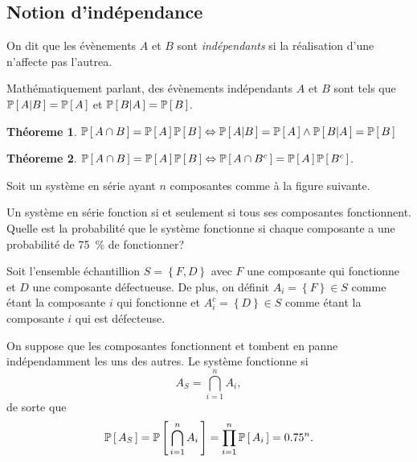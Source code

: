 \documentclass[11pt]{article}
\renewcommand\P[1]{%
	\ensuremath{%
		\mathbb{P}\left[\,#1\,\right]%
	}%
}%
\newcommand\Pg[2]{%
	\ensuremath{%
		\mathbb{P}\left[\,#1\middle\rvert#2\,\right]%
	}%
}%
\newtheorem{theoreme}{Théoreme}[section]
\begin{document}
\subsection{Notion d'indépendance}
\begin{definition}
	On dit que les évènements $A$ et $B$ sont \textit{indépendants} si la
	réalisation d'une n'affecte pas l'autrea.
\end{definition}

Mathématiquement parlant, des évènements indépendants $A$ et $B$ sont tels que
$\Pg{A}{B}=\P{A}$ et $\Pg{B}{A}=\P{B}$.

\begin{theoreme}
	$\P{A\cap B}=\P{A}\P{B}\Leftrightarrow\Pg{A}{B}=\P{A}\wedge\Pg{B}{A}=\P{B}$
\end{theoreme}

\begin{theoreme}
	$\P{A\cap B}=\P{A}\P{B}\Leftrightarrow\P{A\cap B^c}=\P{A}\P{B^c}$.
\end{theoreme}

\begin{exemple}
	Soit un système en série ayant $n$ composantes comme à la figure suivante.
	\begin{figure}[H]
		\centering
		
	\end{figure}
	Un système en série fonction si et seulement si tous ses composantes
	fonctionnent. Quelle est la probabilité que le système fonctionne si chaque
	composante a une probabilité de \SI{75}{\percent} de fonctionner?

	Soit l'ensemble échantillion $S=\left\{F,D\right\}$ avec $F$ une composante
	qui fonctionne et $D$ une composante défectueuse. De plus, on définit
	$A_i=\left\{F\right\}\in S$ comme étant la composante $i$ qui fonctionne et
	$A_i^c=\left\{D\right\}\in S$ comme étant la composante $i$ qui est
	défecteuse.

	On suppose que les composantes fonctionnent et tombent en panne
	indépendamment les uns des autres. Le système fonctionne si
	\begin{equation*}
		A_S=\bigcap_{i=1}^nA_i,
	\end{equation*}
	de sorte que
	\begin{equation*}
		\P{A_S}
		=\P{\bigcap_{i=1}^nA_i}
		=\prod_{i=1}^n\P{A_i}
		=\SI{0.75}{}^n.
	\end{equation*}
\end{exemple}
\end{document}

